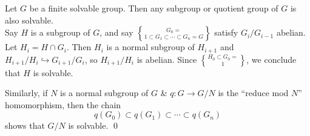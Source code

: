 \thm Let $G$ be a finite solvable group.  Then any subgroup or quotient group of $G$ is also solvable. \\\newcommand{\embeds}{\hookrightarrow}
\pf Say $H$ is a subgroup of $G$, and say $G_0=\brace1\subset G_1\subset\dotsb\subset G_n=G$ satisfy $G_i/G_{i-1}$ abelian.  Let $H_i=H\cap G_i$.  Then $H_i$ is a normal subgroup of $H_{i+1}$ and $H_{i+1}/H_i\embeds G_{i+1}/G_i$, so $H_{i+1}/H_i$ is abelian.  Since $H_0\subset G_0=\brace1$, we conclude that $H$ is solvable.

Similarly, if $N$ is a normal subgroup of $G$ \& $q\colon G\to G/N$ is the ``reduce mod $N$'' homomorphism, then the chain
\[ q(G_0) \subset q(G_1) \subset \dotsb \subset q(G_n) \]
shows that $G/N$ is solvable. \qed
